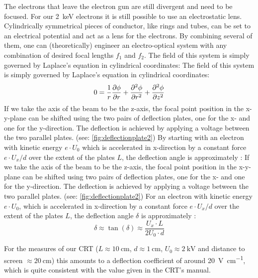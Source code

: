 The electrons that leave the electron gun are still divergent and need to be focused. For our \SI{2}{\kilo\electronvolt} electrons it is still possible to use an electrostatic lens. Cylindrically symmetrical pieces of conductor, like rings and tubes, can be set to an electrical potential and act as a lens for the electrons. By combining several of them, one can (theoretically) engineer an electro-optical system with any combination of desired focal lengths $f_1$ and $f_2$. The field of this system is simply governed by Laplace's equation in cylindrical coordinates:
The field of this system is simply governed by Laplace's equation in 
cylindrical coordinates:
\begin{equation}
	0=\dfrac{1}{r}\pdv{\phi}{r}+\pdv[2]{\phi}{r}+\pdv[2]{\phi}{z}
\end{equation}
If we take the axis of the beam to be the z-axis, the focal point position in the x-y-plane can be shifted using the two pairs of deflection plates, one for the x- and one for the y-direction. The deflection is achieved by applying a voltage between the two parallel plates. (see: \cref{fig:deflectionplate2}) By starting with an electron with kinetic energy $e \cdot U_0$ which is accelerated in x-direction by a constant force $e\cdot U_x / d$ over the extent of the plates $L$, the deflection angle is approximately \cite{Demtroeder3}:
If we take the axis of the beam to be the z-axis, the focal point position in the x-y-plane can be shifted using two pairs of deflection plates, one for the x- and one for the y-direction. The deflection is achieved by applying a voltage between the two parallel plates. (see: \cref{fig:deflectionplate2}) For an electron with kinetic energy $e \cdot U_0$, which is accelerated in x-direction by a constant force $e\cdot U_x / d$ over the extent of the plates $L$, the deflection angle $\delta$ is approximately \cite{Demtroeder3}:
\begin{equation}\label{key}
	\delta \approx \tan(\delta) \approx \frac{U_x\cdot L}{2 U_0 \cdot d}
\end{equation}

For the measures of our CRT ($ L \approx \SI{10}{\centi\meter}$, $d \approx \SI{1}{\centi\meter}$, $U_0 \approx \SI{2}{\kilo\volt}$ and distance to screen $\approx \SI{20}{\centi\meter}$) this amounts to a deflection coefficient of around \SI{20}{\volt\per\centi\meter}, which is quite consistent with the value given in the CRT's manual. 

